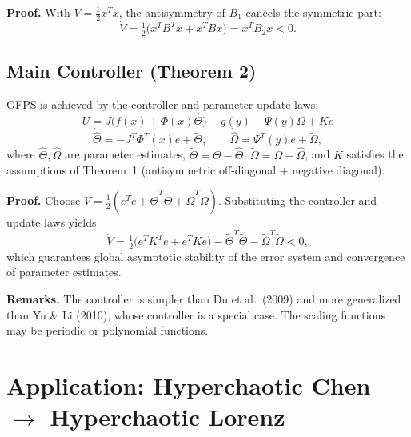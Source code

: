 \documentclass[11pt,a4paper]{article}
\begin{document}
\textbf{Proof.} With $V = \tfrac12 x^T x$, the antisymmetry of $B_1$ cancels the symmetric part:
\begin{equation}
\dot{V} = \tfrac12\big(x^T B^T x + x^T B x\big) = x^T B_2 x < 0.
\label{eq:lyap}
\end{equation}

\subsection{Main Controller (Theorem 2)}

GFPS is achieved by the controller and parameter update laws:
\begin{equation}
\boxed{U = J\big(f(x) + \Phi(x)\hat\Theta\big) - g(y) - \Psi(y)\hat\Omega + Ke}
\label{eq:controller}
\end{equation}
\begin{equation}
\dot{\hat\Theta} = -J^T \Phi^T(x) e + \tilde\Theta, \qquad
\dot{\hat\Omega} = \Psi^T(y) e + \tilde\Omega,
\label{eq:update}
\end{equation}
where $\hat\Theta, \hat\Omega$ are parameter estimates, $\tilde\Theta = \Theta - \hat\Theta$, $\tilde\Omega = \Omega - \hat\Omega$, and $K$ satisfies the assumptions of Theorem~1 (antisymmetric off-diagonal + negative diagonal).

\textbf{Proof.} Choose $V = \tfrac12(e^T e + \tilde\Theta^T\tilde\Theta + \tilde\Omega^T\tilde\Omega)$. Substituting the controller and update laws yields
\begin{equation}
\dot V = \tfrac12\big(e^T K^T e + e^T K e\big) - \tilde\Theta^T\tilde\Theta - \tilde\Omega^T\tilde\Omega < 0,
\label{eq:vdot}
\end{equation}
which guarantees global asymptotic stability of the error system and convergence of parameter estimates.

\textbf{Remarks.} The controller is simpler than Du et al.\ (2009) and more generalized than Yu \& Li (2010), whose controller is a special case. The scaling functions may be periodic or polynomial functions.

\section{Application: Hyperchaotic Chen $\to$ Hyperchaotic Lorenz}
\end{document}
